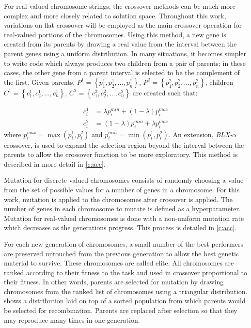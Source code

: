 For real-valued chromosome strings, the crossover methods can be much more complex and more closely related to
solution space. Throughout this work, variations on flat crossover will be employed as the main crossover
operation for real-valued portions of the chromosomes\cite{cordon:01bk}. Using this method, a new gene is
created from its parents by drawing a real value from the interval between the parent genes using a uniform
distribution. In many situations, it becomes simpler to write code which always produces two children from a
pair of parents; in these cases, the other gene from a parent interval is selected to be the complement of the
first. Given parents, $P^1 = \left\{p_1^1, p_2^1, \dots, p_n^1\right\},\,P^2=\left\{p_1^2,p_2^2, \dots,
p_n^2\right\}$, children
$C^1=\left\{c_1^1, c_2^1, \dots, c_n^1\right\},\,C^2=\left\{c_1^2,c_2^2,\dots,c_n^2\right\}$ are
created such that:

\begin{align}
    c_i^1 &= \lambda p_i^{min} + (1 - \lambda)p_i^{max}\label{e:flat_cx_c1}\\
    c_i^2 &= (1-\lambda)p_i^{min} + \lambda p_i^{max}\label{e:flat_cx_c2}
\end{align}
where $p_i^{max}=\max(p_i^1,p_i^2)$ and $p_i^{min}=\min(p_i^1,p_i^2)$. An extension, \emph{BLX-$\alpha$}
crossover, is used to expand the selection region beyond the interval between the parents to allow the
crossover function to be more exploratory\cite{cordon:01bk}. This method is described in more detail in
\cref{c:acc}.

Mutation for discrete-valued chromosomes consists of randomly choosing a value from the set of possible values
for a number of genes in a chromosome. For this work, mutation is applied to the chromosomes after crossover is
applied. The number of genes in each chromosome to mutate is defined as a hyperparameter. Mutation for
real-valued chromosomes is done with a non-uniform mutation rate which decreases as the generations progress.
This process is detailed in \cref{c:acc}.

For each new generation of chromosomes, a small number of the best performers are preserved untouched from the
previous generation to allow the best genetic material to survive. These chromosomes are called elite. All
chromosomes are ranked according to their fitness to the task and used in crossover proportional to their
fitness. In other words, parents are selected for mutation by drawing chromosomes from the ranked list of
chromosomes using a triangular distribution.  shows a distribution laid on top of a sorted
population from which parents would be selected for  recombination. Parents are replaced after selection so
that they may reproduce many times in one generation.

